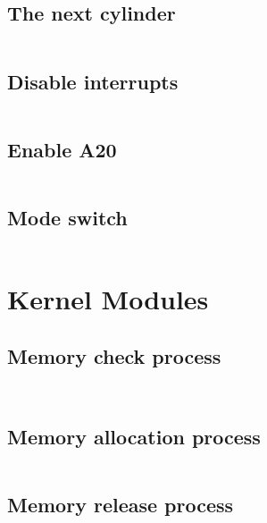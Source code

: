 \documentclass{swfcthesis}
\begin{document}
\inputminted[firstline=108,lastline=132,linenos=true]{nasm}{../../src/kernel/ipl10.asm}

\subsection{The next cylinder}
\label{sec:the-nex-cyl}
\inputminted[firstline=134,lastline=137,linenos=true]{nasm}{../../src/kernel/ipl10.asm}

\subsection{Disable interrupts}
\label{sec:switch1}
\inputminted[firstline=75,lastline=83,linenos=true]{nasm}{../../src/kernel/asmhead.asm}

\subsection{Enable A20}
\label{sec:switch2}
\inputminted[firstline=85,lastline=94,linenos=true]{nasm}{../../src/kernel/asmhead.asm}

\subsection{Mode switch}
\label{sec:switch3}
\inputminted[firstline=98,lastline=111,linenos=true]{nasm}{../../src/kernel/asmhead.asm}


\section{Kernel Modules}
\label{sec:kernel-modules}
\subsection{Memory check process}
\label{sec:memory-check-process}

\inputminted[firstline=7, lastline=42, linenos=true]{c}{../../src/kernel/memory.c}
\inputminted[firstline=220, lastline=254,
linenos=true]{nasm}{../../src/kernel/naskfunc.asm}

\subsection{Memory allocation process}
\label{sec:memory-alloc-proc}
\inputminted[tabsize=2, firstline=64, lastline=85,
linenos=true]{c}{../../src/kernel/memory.c}

\subsection{Memory release process}
\label{sec:memory-rele-proc}
\inputminted[tabsize=2, firstline=88, lastline=158,
linenos=true]{c}{../../src/kernel/memory.c}
\end{document}
